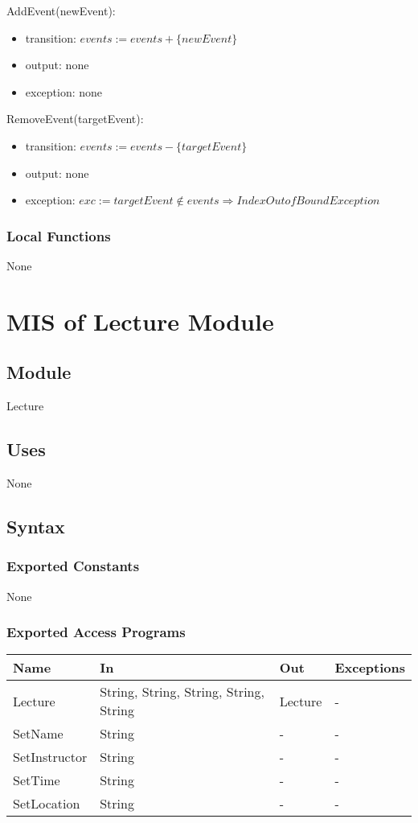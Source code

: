 \documentclass[12pt, titlepage]{article}
\begin{document}
\noindent AddEvent(newEvent):
\begin{itemize}
\item transition: $events := events + \{newEvent\}$
\item output: none
\item exception: none
\end{itemize}

\noindent RemoveEvent(targetEvent):
\begin{itemize}
\item transition: $events := events - \{targetEvent\}$
\item output: none
\item exception: $exc := targetEvent \notin events \Rightarrow IndexOutofBound Exception$
\end{itemize}
\subsubsection{Local Functions}

None

\newpage

\section{MIS of Lecture Module} \label{mLec}

\subsection{Module}

Lecture

\subsection{Uses}

None

\subsection{Syntax}

\subsubsection{Exported Constants}
None

\subsubsection{Exported Access Programs}
\begin{center}
\begin{tabular}{p{4cm} p{2cm} p{4cm} p{4cm}}
\hline
\textbf{Name} & \textbf{In} & \textbf{Out} & \textbf{Exceptions} \\
\hline
Lecture & String, String, String, String, String & Lecture & -\\
SetName & String & - & -\\
SetInstructor & String & - & -\\
SetTime & String & - & -\\
SetLocation & String & - & -\\
\hline
\end{tabular}
\end{center}
\end{document}
